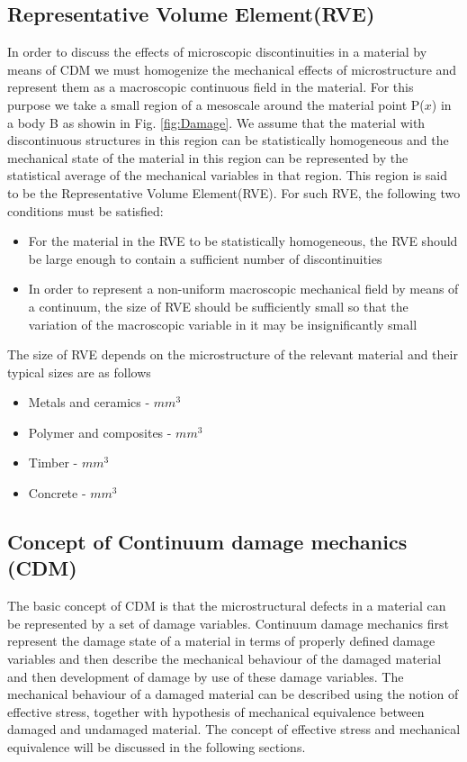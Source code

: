 \documentclass[a4paper,12pt]{article}
\begin{document}
\subsection{Representative Volume Element(RVE)}
\indent\indent\indent  In order to discuss the effects of microscopic discontinuities in  a material by means of CDM we must homogenize the mechanical effects of microstructure and represent them as a macroscopic continuous field in the material. For this purpose we take a small region of a mesoscale around the material point P($x$) in a body B as showin in Fig. \ref{fig:Damage}. We assume that the  material with discontinuous structures in this region can be statistically homogeneous and the mechanical state of the material in this region can be represented by the statistical average of the mechanical variables in that region. This region is said to be the Representative Volume Element(RVE). For such RVE, the following two conditions must be satisfied:
\begin{itemize}
\item  For the material in the RVE to be statistically homogeneous, the RVE should be large enough to contain a sufficient number of discontinuities
\item In order to represent a non-uniform macroscopic mechanical field by means of a continuum, the size of RVE should be sufficiently small so that the variation of the macroscopic variable in it may be insignificantly small
\end{itemize}
The size of RVE depends on the microstructure of the relevant material and their typical sizes are as follows
\begin{itemize}
\item Metals and ceramics  \;    -    $mm^3$
\item Polymer and composites \;   -   $mm^3$
\item Timber\; - $mm^3$
\item Concrete \; - $mm^3$
\end{itemize}
\newpage
\subsection{Concept of Continuum damage mechanics (CDM)}
\indent\indent\indent The basic concept of CDM is that the  microstructural defects in a material can be represented by a set of damage variables.  Continuum damage mechanics first represent the damage state of a material in terms of properly defined damage variables and then describe the mechanical behaviour of the damaged material and then development of damage by use of these damage variables. The mechanical behaviour of a damaged material can be described using the notion of effective stress, together with hypothesis of mechanical equivalence between damaged and undamaged material. The concept of effective stress and mechanical equivalence will be discussed in the following sections.
\end{document}

